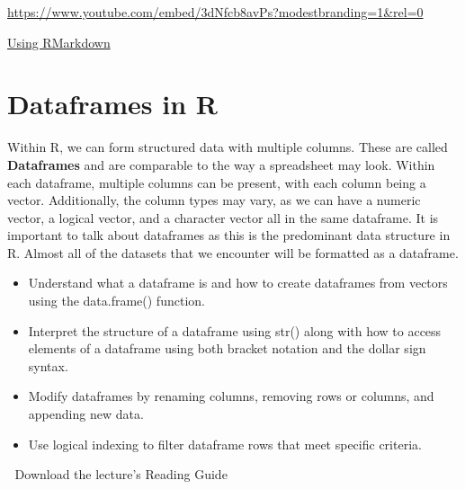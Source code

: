 \documentclass[
  letterpaper,
  DIV=11,
  numbers=noendperiod]{scrreprt}
\providecommand{\tightlist}{%
  \setlength{\itemsep}{0pt}\setlength{\parskip}{0pt}}
\begin{document}
\url{https://www.youtube.com/embed/3dNfcb8avPs?modestbranding=1&rel=0}

\begin{watch}{}{}
    \href{https://youtu.be/Sm6aMty-xiE}{Using RMarkdown}
\end{watch}


\chapter{Dataframes in R}\label{dataframes-in-r}

Within R, we can form structured data with multiple columns. These are
called \textbf{Dataframes} and are comparable to the way a spreadsheet
may look. Within each dataframe, multiple columns can be present, with
each column being a vector. Additionally, the column types may vary, as
we can have a numeric vector, a logical vector, and a character vector
all in the same dataframe. It is important to talk about dataframes as
this is the predominant data structure in R. Almost all of the datasets
that we encounter will be formatted as a dataframe.

\begin{itemize}
\tightlist
\item
  Understand what a dataframe is and how to create dataframes from
  vectors using the data.frame() function.
\item
  Interpret the structure of a dataframe using str() along with how to
  access elements of a dataframe using both bracket notation and the
  dollar sign syntax.
\item
  Modify dataframes by renaming columns, removing rows or columns, and
  appending new data.
\item
  Use logical indexing to filter dataframe rows that meet specific
  criteria.
\end{itemize}

\begin{tcolorbox}[enhanced jigsaw, leftrule=.75mm, arc=.35mm, coltitle=black, rightrule=.15mm, bottomrule=.15mm, toprule=.15mm, left=2mm, colbacktitle=quarto-callout-tip-color!10!white, title=\textcolor{quarto-callout-tip-color}{\faLightbulb}\hspace{0.5em}{Supplemental Material}, toptitle=1mm, breakable, colframe=quarto-callout-tip-color-frame, bottomtitle=1mm, titlerule=0mm, colback=white, opacityback=0, opacitybacktitle=0.6]

📄 Download the lecture's Reading Guide

\end{tcolorbox}
\end{document}
